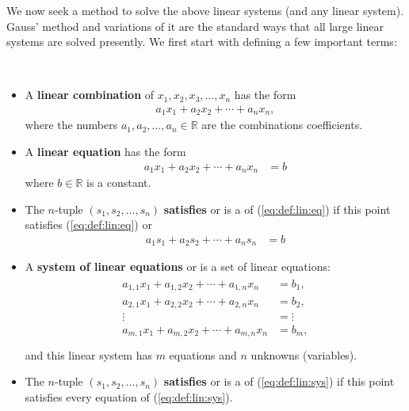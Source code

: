We now seek a method to solve the above linear systems (and any linear system).  Gauss' method and variations of it are the standard ways that all large linear systems are solved presently.   We first start with defining a few important terms:
\begin{definition}  ~ 

\begin{itemize}
\item
A \textbf{linear combination} of $x_1, x_2, x_3, \ldots, x_n$ has the form
%
\begin{align*}
a_1 x_1 + a_2 x_2 + \cdots + a_n x_n, 
\end{align*}
where the numbers $a_1, a_2, \ldots, a_n \in \mathbb{R}$ are the combinations coefficients.  

\item A \textbf{linear equation} has the form
%
\begin{align}
a_1 x_1 + a_2 x_2 + \cdots + a_n x_n & = b 
\label{eq:def:lin:eq}
\end{align}
where $b \in \mathbb{R}$ is a constant.  
\item The $n$-tuple $(s_1,s_2,\ldots,s_n)$ \textbf{satisfies} or is a  of (\ref{eq:def:lin:eq}) if this point satisfies (\ref{eq:def:lin:eq}) or 
%
\begin{align*}
a_1 s_1 + a_2 s_2 + \cdots + a_n s_n & = b
\end{align*}
\item A \textbf{system of linear equations} or  is a set of linear equations:
%
\begin{align}
\begin{split}
a_{1,1} x_1 + a_{1,2} x_2 + \cdots + a_{1,n} x_n & = b_1 , \\
a_{2,1} x_1 + a_{2,2} x_2 + \cdots + a_{2,n} x_n & = b_2, \\
\vdots & = \vdots \\
a_{m,1} x_1 + a_{m,2} x_2 + \cdots + a_{m,n} x_n & = b_m, \\
\end{split} \label{eq:def:lin:sys}
\end{align}
and this linear system has $m$ equations and $n$ unknowns (variables).  
\item The $n$-tuple $(s_1,s_2,\ldots,s_n)$ \textbf{satisfies} or is a  of (\ref{eq:def:lin:sys}) if this point satisfies every equation of (\ref{eq:def:lin:sys}).  
\end{itemize}

\end{definition}

